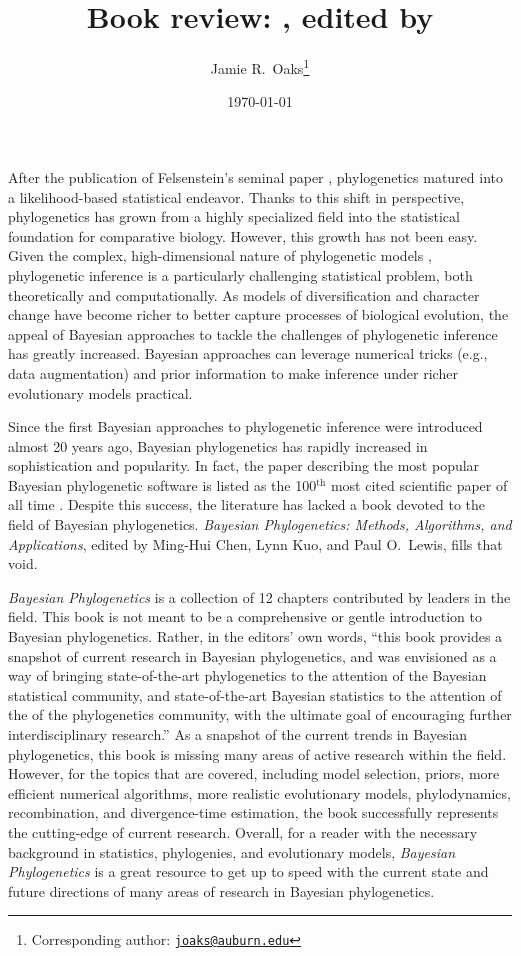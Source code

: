 \documentclass[letterpaper,12pt]{article}
\title{Book review: \bookfulltitle, edited by \editors}
\author[1,2]{Jamie R.\ Oaks\thanks{Corresponding author: \href{mailto:joaks@auburn.edu}{\tt joaks@auburn.edu}}}
\affil[1]{Department of Biology, University of Washington, Seattle, Washington 98195}
\affil[2]{Department of Biological Sciences, Auburn University, Auburn, Alabama 36849}
\date{\today}
\newcommand{\super}[1]{\ensuremath{^{\textrm{#1}}}}
\newcommand{\booktitle}{\textit{Bayesian Phylogenetics}\xspace}
\newcommand{\booksubtitle}{\textit{Methods, Algorithms, and Applications}\xspace}
\newcommand{\bookfulltitle}{\textit{\booktitle: \booksubtitle}\xspace}
\newcommand{\editors}{Ming-Hui Chen, Lynn Kuo, and Paul O.\ Lewis\xspace}
\begin{document}
\maketitle

\newpage
\doublespacing

After the publication of Felsenstein's seminal paper \citep{Felsenstein1981},
phylogenetics matured into a likelihood-based statistical endeavor.
Thanks to this shift in perspective, phylogenetics has grown from a highly
specialized field into the statistical foundation for comparative biology.
However, this growth has not been easy.
Given the complex, high-dimensional nature of phylogenetic models
\citep{Kim2000}, phylogenetic inference is a particularly challenging
statistical problem, both theoretically and computationally. 
As models of diversification and character change have become richer to better
capture processes of biological evolution, the appeal of Bayesian approaches to
tackle the challenges of phylogenetic inference has greatly increased.
Bayesian approaches can leverage numerical tricks (e.g., data augmentation) and
prior information to make inference under richer evolutionary models practical.

Since the first Bayesian approaches to phylogenetic inference were introduced
\citep{Rannala1996,Mau1997} almost 20 years ago, Bayesian phylogenetics has
rapidly increased in sophistication and popularity.
In fact, the paper describing the most popular Bayesian phylogenetic software
\citep{Ronquist2003} is listed as the 100\super{th} most cited scientific paper
of all time \citep{VanNoorden2014}.
Despite this success, the literature has lacked a book devoted to the field of
Bayesian phylogenetics.
\bookfulltitle, edited by \editors \citep{Chen2014}, fills that void.

\booktitle is a collection of 12 chapters contributed by leaders in the field.
This book is not meant to be a comprehensive or gentle introduction to Bayesian
phylogenetics.
Rather, in the editors' own words, ``this book provides a snapshot of current
research in Bayesian phylogenetics, and was envisioned as a way of bringing
state-of-the-art phylogenetics to the attention of the Bayesian statistical
community, and state-of-the-art Bayesian statistics to the attention of the of
the phylogenetics community, with the ultimate goal of encouraging further
interdisciplinary research.''
As a snapshot of the current trends in Bayesian phylogenetics, this book is
missing many areas of active research within the field.
However, for the topics that are covered, including model selection, priors,
more efficient numerical algorithms, more realistic evolutionary models,
phylodynamics, recombination, and divergence-time estimation, 
the book successfully represents the cutting-edge of current research.
Overall, for a reader with the necessary background in statistics, phylogenies,
and evolutionary models, \booktitle is a great resource to get up to speed with
the current state and future directions of many areas of research in Bayesian
phylogenetics.
\end{document}
